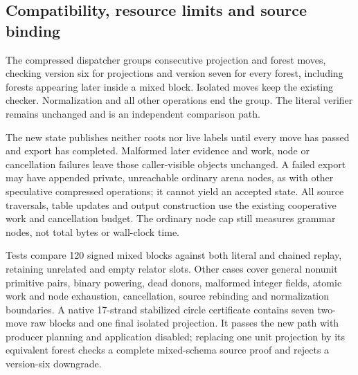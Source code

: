 \subsection{Compatibility, resource limits and source binding}

The compressed dispatcher groups consecutive projection and forest moves,
checking version six for projections and version seven for every forest,
including forests appearing later inside a mixed block. Isolated moves keep
the existing checker. Normalization and all other operations end the group.
The literal verifier remains unchanged and is an independent comparison path.

The new state publishes neither roots nor live labels until every move has
passed and export has completed. Malformed later evidence and work, node or
cancellation failures leave those caller-visible objects unchanged. A failed
export may have appended private, unreachable ordinary arena nodes, as with
other speculative compressed operations; it cannot yield an accepted state.
All source traversals, table updates and output construction use the existing
cooperative work and cancellation budget. The ordinary node cap still measures
grammar nodes, not total bytes or wall-clock time.

Tests compare 120 signed mixed blocks against both literal and chained replay,
retaining unrelated and empty relator slots. Other cases cover general
nonunit primitive pairs, binary powering, dead donors, malformed integer
fields, atomic work and node exhaustion, cancellation, source rebinding and
normalization boundaries. A native 17-strand stabilized circle certificate
contains seven two-move raw blocks and one final isolated projection. It
passes the new path with producer planning and application disabled; replacing
one unit projection by its equivalent forest checks a complete mixed-schema
source proof and rejects a version-six downgrade.


